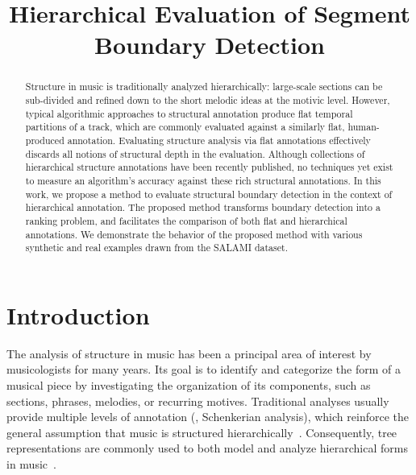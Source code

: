 \documentclass{article}
\title{Hierarchical Evaluation of Segment Boundary Detection}
\begin{document}
%
\maketitle
%
\begin{abstract}
Structure in music is traditionally analyzed hierarchically: large-scale sections can be sub-divided and refined down to the short melodic ideas at the motivic level. 
However, typical algorithmic approaches to structural annotation produce flat temporal partitions of a track, which are commonly evaluated against a similarly flat, human-produced
annotation. Evaluating structure analysis via flat annotations effectively discards all notions of structural depth in the evaluation.
Although collections of hierarchical structure annotations have been recently published, no techniques yet exist to measure an algorithm's accuracy against these rich structural annotations.
In this work, we propose a method to evaluate structural boundary detection in the context of hierarchical annotation.
The proposed method transforms boundary detection into a ranking problem, and facilitates the comparison of
both flat and hierarchical annotations.
We demonstrate the behavior of the proposed method with various synthetic and real
examples drawn from the SALAMI dataset. 
\end{abstract}
%
\section{Introduction}\label{sec:introduction}

The analysis of structure in music has been a principal area of interest by musicologists for many years.
Its goal is to identify and categorize the form of a musical piece by investigating the organization of its components, such as sections, phrases, melodies, or recurring motives.
Traditional analyses usually provide multiple levels of annotation (\eg, Schenkerian analysis), which reinforce the general assumption that music is structured hierarchically~\cite{Lerdahl1983a}.
Consequently, tree representations are commonly used to both model and analyze hierarchical forms in music~\cite{Lerdahl1983}.
\end{document}
